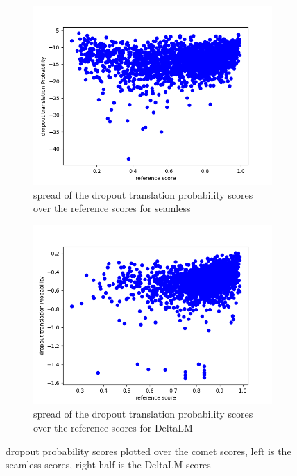 \begin{figure}[ht]
    \centering%
    \begin{subfigure}{0.4\linewidth}
        \includegraphics[width=\textwidth]{Latex/sections/images/seamlessdropprob.png}
        \caption{spread of the dropout translation probability scores over the reference scores for seamless}
    \end{subfigure}
    \begin{subfigure}{0.4\linewidth}
        \includegraphics[width=\textwidth]{Latex/sections/images/dlmdropprob.png}
        \caption{spread of the dropout translation probability scores over the reference scores for DeltaLM}
    \end{subfigure}
        \caption{dropout probability scores plotted over the comet scores, left is the seamless scores, right half is the DeltaLM scores}
        \label{fig:dropout translation probability scores}
    \end{figure}

